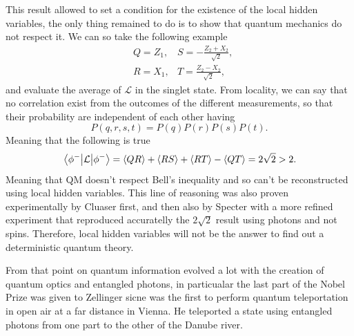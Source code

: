 \noindent
This result allowed to set a condition for the existence of the local hidden variables, the only thing remained to do is to show that quantum mechanics do not respect it. We can so take the following example 
\begin{align}
    &Q=Z_1, &S=-\frac{Z_2 + X_2}{\sqrt{2}},\\
    &R=X_1, &T=\frac{Z_2 - X_2}{\sqrt{2}},
\end{align}
and evaluate the average of $\mathcal{L}$ in the singlet state. From locality, we can say that no correlation exist from the outcomes of the different measurements, so that their probability are independent of each other having
\begin{equation}
    P(q, r, s, t) = P(q)P(r)P(s)P(t).
\end{equation}
Meaning that the following is true
\begin{equation}
    \ev{\mathcal{L}}{\phi^-} = \left\langle QR \right\rangle + \left\langle RS \right\rangle + \left\langle RT \right\rangle - \left\langle QT \right\rangle = 2\sqrt{2} > 2.
\end{equation}
Meaning that QM doesn't respect Bell's inequality and so can't be reconstructed using local hidden variables. This line of reasoning was also proven experimentally by Cluaser first, and then also by Specter with a more refined experiment that reproduced accuratelly the $2\sqrt{2}$ result using photons and not spins. Therefore, local hidden variables will not be the answer to find out a deterministic quantum theory.

From that point on quantum information evolved a lot with the creation of quantum optics and entangled photons, in particualar the last part of the Nobel Prize was given to Zellinger sicne was the first to perform quantum teleportation in open air at a far distance in Vienna. He teleported a state using entangled photons from one part to the other of the Danube river.